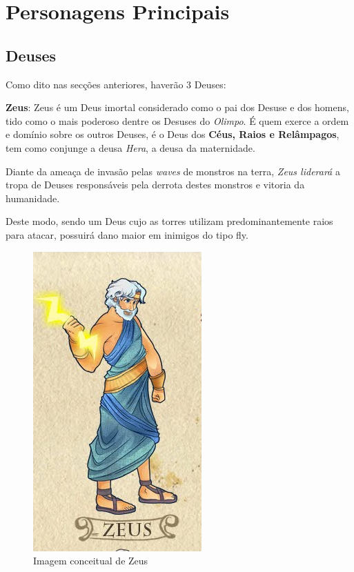 \documentclass[11pt]{article} %
\begin{document}
\newpage

\section{Personagens Principais}

\subsection{Deuses}
Como dito nas secções anteriores, haverão 3 Deuses:

{\large \textbf{Zeus}}: Zeus é um Deus imortal considerado como o pai dos Desuse e dos homens, tido como o mais poderoso dentre os Desuses do \textit{Olimpo}. É quem exerce a ordem e domínio sobre os outros Deuses, é o Deus dos \textbf{Céus, Raios e Relâmpagos}, tem como conjunge a deusa \textit{Hera}, a deusa da maternidade. 

Diante da ameaça de invasão pelas \textit{waves} de monstros na terra, \textit{Zeus liderará} a tropa de Deuses responsáveis pela derrota destes monstros e vitoria da humanidade. 

Deste modo, sendo um Deus cujo as torres utilizam predominantemente raios para atacar, possuirá dano maior em inimigos do tipo fly.
\begin{figure}[!htp]
\centering
\includegraphics[scale=0.25]{res/characters/zeus.png}
\caption{Imagem conceitual de Zeus}
\label{zeus}
\end{figure}
\end{document}
